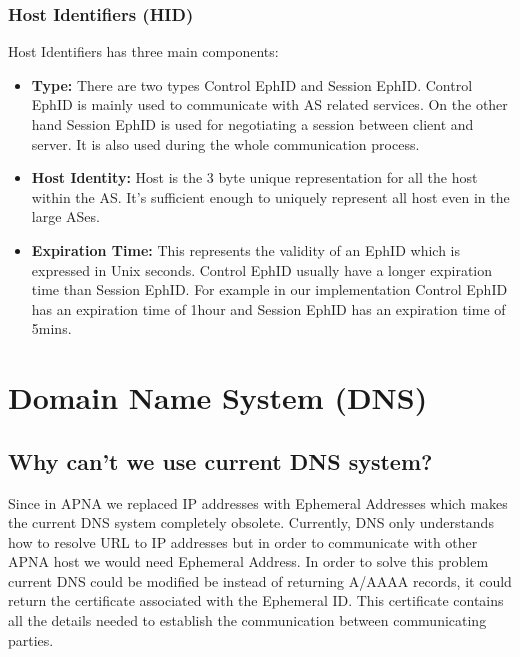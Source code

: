 \subsubsection{Host Identifiers (HID)}
\begin{center}
\end{center}
Host Identifiers has three main components:
\begin{itemize}
    \item \textbf{Type:} There are two types Control EphID and Session EphID. Control EphID is mainly used to communicate with AS related services. On the other hand Session EphID is used for negotiating a session between client and server. It is also used during the whole communication process.
    \item \textbf{Host Identity:} Host is the 3 byte unique representation for all the host within the AS. It's sufficient enough to uniquely represent all host even in the large ASes.
    \item \textbf{Expiration Time:} This represents the validity of an EphID which is expressed in Unix seconds. Control EphID usually have a longer expiration time than Session EphID. For example in our implementation Control EphID has an expiration time of 1hour and Session EphID has an expiration time of 5mins.
\end{itemize}
\section{Domain Name System (DNS)}
\subsection{Why can't we use current DNS system?}
Since in APNA we replaced IP addresses with Ephemeral Addresses which makes the current DNS system completely obsolete. Currently, DNS only understands how to resolve URL to IP addresses but in order to communicate with other APNA host we would need Ephemeral Address. In order to solve this problem current DNS could be modified be instead of returning A/AAAA records, it could return the certificate associated with the Ephemeral ID. This certificate contains all the details needed to establish the communication between communicating parties.

